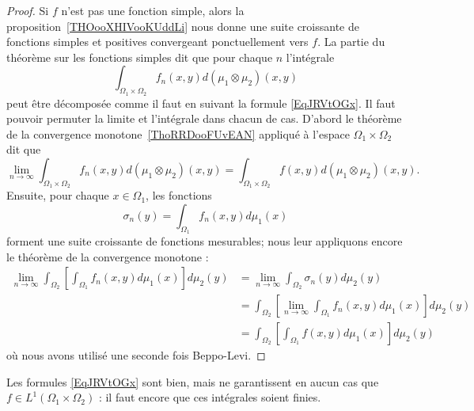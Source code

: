 \begin{proof}
    Si \( f\) n'est pas une fonction simple, alors la proposition~\ref{THOooXHIVooKUddLi} nous donne une suite croissante de fonctions simples et positives convergeant ponctuellement vers \( f\). La partie du théorème sur les fonctions simples dit que pour chaque \( n\) l'intégrale
    \begin{equation}
        \int_{\Omega_1\times \Omega_2}f_n(x,y)d(\mu_1\otimes\mu_2)(x,y)
    \end{equation}
    peut être décomposée comme il faut en suivant la formule \eqref{EqJRVtOGx}. Il faut pouvoir permuter la limite et l'intégrale dans chacun de cas. D'abord le théorème de la convergence monotone~\ref{ThoRRDooFUvEAN} appliqué à l'espace \( \Omega_1\times \Omega_2\) dit que
    \begin{equation}
        \lim_{n\to \infty} \int_{\Omega_1\times \Omega_2}f_n(x,y)d(\mu_1\otimes \mu_2)(x,y)= \int_{\Omega_1\times \Omega_2}f(x,y)d(\mu_1\otimes \mu_2)(x,y).
    \end{equation}
    Ensuite, pour chaque \( x\in\Omega_1\), les fonctions
    \begin{equation}
        \sigma_n(y)=\int_{\Omega_1}f_n(x,y)d\mu_1(x)
    \end{equation}
    forment une suite croissante de fonctions mesurables; nous leur appliquons encore le théorème de la convergence monotone :
    \begin{subequations}
        \begin{align}
            \lim_{n\to \infty} \int_{\Omega_2}\left[ \int_{\Omega_1}f_n(x,y)d\mu_1(x) \right]d\mu_2(y)&=\lim_{n\to \infty} \int_{\Omega_2}\sigma_n(y)d\mu_2(y)\\
            &=\int_{\Omega_2}\left[\lim_{n\to \infty} \int_{\Omega_1}f_n(x,y)d\mu_1(x)\right]d\mu_2(y)\\
            &=\int_{\Omega_2}\left[ \int_{\Omega_1}f(x,y)d\mu_1(x) \right]d\mu_2(y)
        \end{align}
    \end{subequations}
    où nous avons utilisé une seconde fois Beppo-Levi.
\end{proof}

\begin{remark}
    Les formules \eqref{EqJRVtOGx} sont bien, mais ne garantissent en aucun cas que \( f\in L^1(\Omega_1\times \Omega_2)\) : il faut encore que ces intégrales soient finies.
\end{remark}

